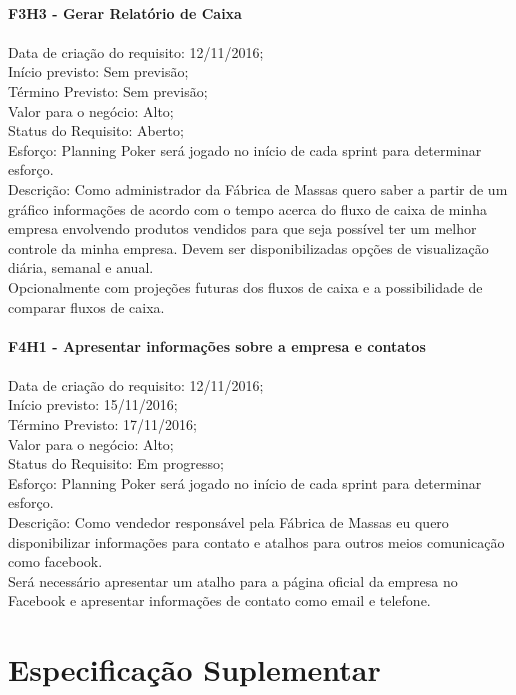 \begin{apendicesenv}
\\
\textbf{F3H3 - Gerar Relatório de Caixa}\\ \\
\tab Data de criação do requisito: 12/11/2016;\\
\tab Início previsto: Sem previsão;\\
\tab Término Previsto: Sem previsão;\\
\tab Valor para o negócio: Alto;\\
\tab Status do Requisito: Aberto;\\
\tab Esforço: Planning Poker será jogado no início de cada sprint para determinar esforço.\\
\tab Descrição: Como administrador da Fábrica de Massas quero saber a partir de um gráfico informações de acordo com o tempo acerca do fluxo de caixa de minha empresa envolvendo produtos vendidos para que seja possível ter um melhor controle da minha empresa. Devem ser disponibilizadas opções de visualização diária, semanal e anual.\\
\tab Opcionalmente com projeções futuras dos fluxos de caixa e a possibilidade de comparar fluxos de caixa.\\
\\
\textbf{F4H1 - Apresentar informações sobre a empresa e contatos}\\ \\
\tab Data de criação do requisito: 12/11/2016;\\
\tab Início previsto: 15/11/2016;\\
\tab Término Previsto: 17/11/2016;\\
\tab Valor para o negócio: Alto;\\
\tab Status do Requisito: Em progresso;\\
\tab Esforço: Planning Poker será jogado no início de cada sprint para determinar esforço.\\
\tab Descrição: Como vendedor responsável pela Fábrica de Massas eu quero disponibilizar informações para contato e atalhos para outros meios comunicação como facebook.\\
\tab Será necessário apresentar um atalho para a página oficial da empresa no Facebook e apresentar informações de contato como email e telefone.\\

\chapter{Especificação Suplementar}


\end{apendicesenv}
